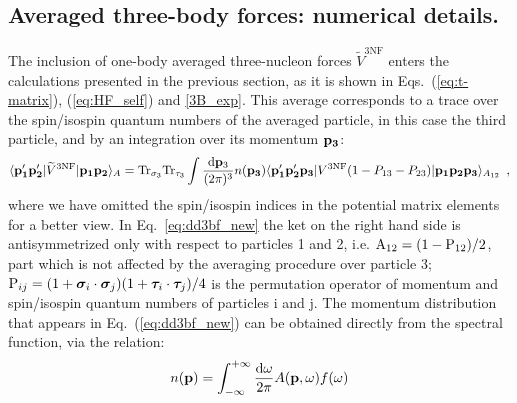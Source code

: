 \subsection{Averaged three-body forces: numerical details.}
\label{subsec:average_3bf}
The inclusion of one-body averaged three-nucleon forces $\widetilde V^\mathrm{3NF}$ enters the calculations presented in the previous section, as it is shown in Eqs.~(\ref{eq:t-matrix}), (\ref{eq:HF_self}) and \eqref{3B_exp}. This average corresponds to a trace over the spin/isospin quantum numbers of the averaged particle, in this case the third particle, and by an integration over its momentum ${\bf p_3}$:
\begin{equation}
\langle {\bf p'_1 p'_2}|\widetilde V^\mathrm{3NF}|{\bf p_1 p_2}\rangle_A =
\mathrm{Tr}_{\sigma_3}\mathrm{Tr}_{\tau_3}
\int \frac{{\mathrm d}{\bf p}_3}{(2\pi)^3}n({\bf p_3})
\langle {\bf p_1' p_2' p_3}|V^\mathrm{3NF}
(1-P_{13}-P_{23})
|{\bf p_1 p_2 p_3}\rangle_{A_{12}}\ \,,
\label{eq:dd3bf_new}
\end{equation}
where we have omitted the spin/isospin indices in the potential matrix elements for a better view. In Eq.~\ref{eq:dd3bf_new} the ket on the right hand side is antisymmetrized only with respect to particles 1 and 2, i.e. ${\rm A}_{12}=(1-{\rm P}_{12})/2$, part which is not affected by the averaging procedure over particle 3; ${\rm P}_{ij}=(1+\boldsymbol \sigma_i\cdot\boldsymbol \sigma_j)(1+\boldsymbol \tau_i\cdot\boldsymbol \tau_j)/4$ is the permutation operator of momentum and spin/isospin quantum numbers of particles i and j. The momentum distribution that appears in Eq.~(\ref{eq:dd3bf_new}) can be obtained directly from the spectral function, via the relation:
\begin{equation}
\label{eq:mom_dist}
n({\bf p})=\int_{-\infty}^{+\infty}\frac{{\rm d}\omega}{2\pi}A({\bf p},\omega)f(\omega)
\end{equation}

